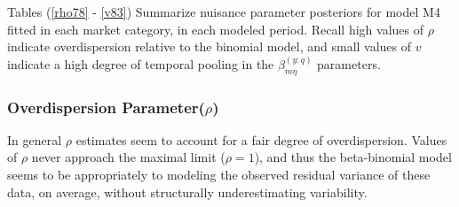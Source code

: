 \documentclass[12pt]{article}
\begin{document}
Tables (\ref{rho78} - \ref{v83}) Summarize nuisance parameter posteriors for model M4 fitted
in each market category, in each modeled period. Recall high values of
\(\rho\) indicate overdispersion relative to the binomial model, and
small values of \(v\) indicate a high degree of temporal pooling in the
\(\beta^{(y:q)}_{m\eta}\) parameters.

\subsubsection{Overdispersion Parameter(\(\rho\))}

In general \(\rho\) estimates seem to account for a fair degree of
overdispersion. Values of \(\rho\) never approach the maximal limit
(\(\rho=1\)), and thus the beta-binomial model seems to be appropriately
to modeling the observed residual variance of these data, on average,
without structurally underestimating variability.
\end{document}
